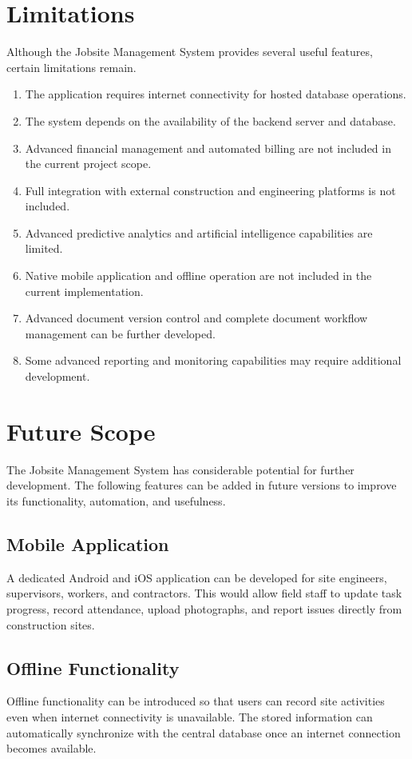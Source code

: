 \documentclass[11pt,a4paper]{article}
\begin{document}
\section{Limitations}
Although the Jobsite Management System provides several useful features, certain limitations remain.
\begin{enumerate}[itemsep=1pt]
\item The application requires internet connectivity for hosted database operations.
\item The system depends on the availability of the backend server and database.
\item Advanced financial management and automated billing are not included in the current project scope.
\item Full integration with external construction and engineering platforms is not included.
\item Advanced predictive analytics and artificial intelligence capabilities are limited.
\item Native mobile application and offline operation are not included in the current implementation.
\item Advanced document version control and complete document workflow management can be further developed.
\item Some advanced reporting and monitoring capabilities may require additional development.
\end{enumerate}

\section{Future Scope}
The Jobsite Management System has considerable potential for further development. The following features can be added in future versions to improve its functionality, automation, and usefulness.

\subsection{Mobile Application}
A dedicated Android and iOS application can be developed for site engineers, supervisors, workers, and contractors. This would allow field staff to update task progress, record attendance, upload photographs, and report issues directly from construction sites.

\subsection{Offline Functionality}
Offline functionality can be introduced so that users can record site activities even when internet connectivity is unavailable. The stored information can automatically synchronize with the central database once an internet connection becomes available.
\end{document}
